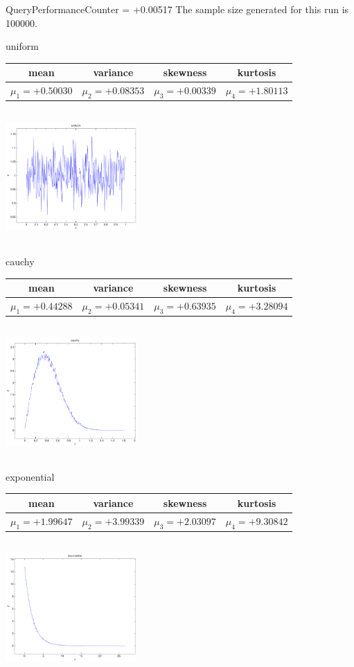 \documentclass[9pt]{article}
\theoremstyle{plain}
\theoremstyle{definition}
\theoremstyle{remark}
\numberwithin{equation}{section}
\begin{document}
QueryPerformanceCounter  =  +0.00517
The sample size generated for this run is 100000.

\newpage
uniform \begin{tabular}{|c|c|c|c|}  mean & variance & skewness & kurtosis \\  \hline
$\mu_1 = +0.50030$ & $\mu_2 = +0.08353$ & $\mu_3 = +0.00339$ & $\mu_4 =+1.80113$ \\
\end{tabular}

\includegraphics[width=5cm,height=5cm]{uniform.pdf}

cauchy \begin{tabular}{|c|c|c|c|}  mean & variance & skewness & kurtosis \\  \hline
$\mu_1 = +0.44288$ & $\mu_2 = +0.05341$ & $\mu_3 = +0.63935$ & $\mu_4 =+3.28094$ \\
\end{tabular}

\includegraphics[width=5cm,height=5cm]{cauchy.pdf}

exponential \begin{tabular}{|c|c|c|c|}  mean & variance & skewness & kurtosis \\  \hline
$\mu_1 = +1.99647$ & $\mu_2 = +3.99339$ & $\mu_3 = +2.03097$ & $\mu_4 =+9.30842$ \\
\end{tabular}

\includegraphics[width=5cm,height=5cm]{exponential.pdf}
\end{document}
